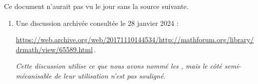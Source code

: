 Ce document n'aurait pas vu le jour sans la source suivante.

\begin{enumerate}
	\item Une discussion archivée consultée le 28 janvier 2024 : 
	
	\noindent
	\url{https://web.archive.org/web/20171110144534/http://mathforum.org/library/drmath/view/65589.html}\,.
	
	\smallskip
	\noindent
	\emph{Cette discussion utilise ce que nous avons nommé les \sftab[x], mais le côté semi-mécanisable de leur utilisation n'est pas souligné.}
\end{enumerate}